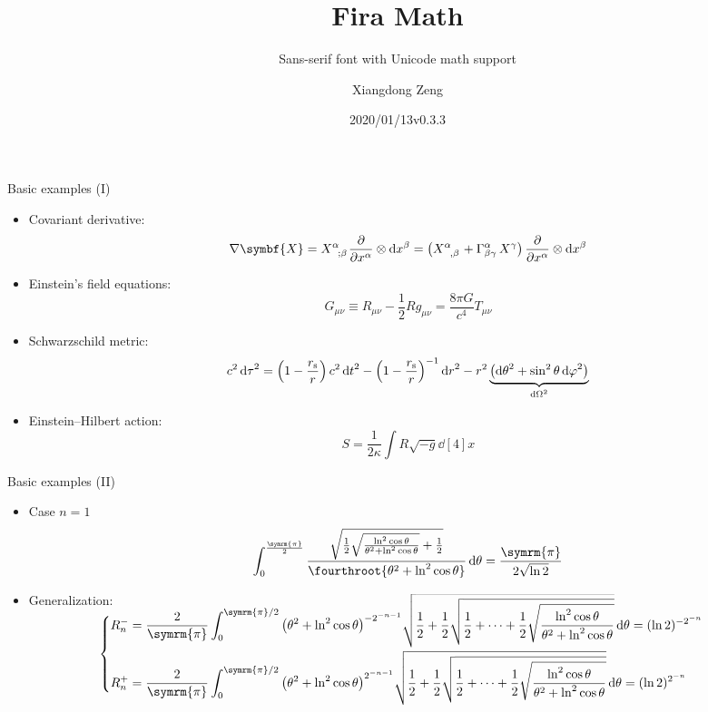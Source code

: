 \documentclass[aspectratio=169]{beamer}
\title{Fira Math}
\subtitle{Sans-serif font with Unicode math support}
\author{Xiangdong Zeng}
\date{2020/01/13\quad v0.3.3}
\def\pp{\symrm{\pi}}
\begin{document}
\maketitle

\begin{frame}{Basic examples (I)}
\begin{itemize}
  \item Covariant derivative:
    \[
      \nabla \symbf{X} = \tensor{X}{^\alpha_{;\beta}} \pdv{x^\alpha} \otimes \dd{x^\beta}
                       = \qty(\tensor{X}{^\alpha_{,\beta}} + \Gamma^{\alpha}_{\beta\gamma} \, X^\gamma) \,
                         \pdv{x^\alpha} \otimes \dd{x^\beta}
    \]
  \item Einstein's field equations:
    \[ G_{\mu\nu} \equiv R_{\mu\nu} - \frac{1}{2} R g_{\mu\nu} = \frac{8\pi G}{c^4} T_{\mu\nu} \]
  \item Schwarzschild metric:
    \[
      c^2 \dd{\tau}^2 = \qty(1-\frac{r_{\mathrm{s}}}{r}) \, c^2 \dd{t}^2
                      - \qty(1-\frac{r_{\mathrm{s}}}{r})^{-1} \dd{r}^2
                      - r^2 \underbrace{\qty(\dd{\theta}^2 + \sin^2 \theta \dd{\varphi}^2)}_{\dd{\Omega}^2}
    \]
  \item Einstein--Hilbert action:
    \[ S = \frac{1}{2\kappa} \int R \sqrt{-g} \dd[4]{x} \]
\end{itemize}
\end{frame}

\begin{frame}{Basic examples (II)}
\begin{itemize}
  \item Case $n=1$
    \small
    \[
      \int_0^{\frac{\pp}{2}}
        \frac{\sqrt{\frac12 \sqrt{\frac{\ln^2\cos\theta}{\theta^2+\ln^2\cos\theta}} + \frac12}}%
            {\fourthroot{\theta^2 + \ln^2\cos\theta}} \dd{\theta}
      = \frac{\pp}{2\sqrt{\ln 2}}
    \]
  \item Generalization:
    \small\vspace{1ex}
    \[
      \begin{cases}
        \smash[t]{\displaystyle
          R_n^- = \frac{2}{\pp} \int_0^{\pp/2} \qty(\theta^2+\ln^2\cos\theta)^{-2^{-n-1}}
                  \sqrt{\frac12+\frac12\sqrt{\frac12+\cdots+\frac12\sqrt{
                        \frac{\ln^2\cos\theta}{\theta^2+\ln^2\cos\theta}}}} \dd{\theta}
                = (\ln 2)^{-2^{-n}}} \\[3ex]
        \smash[b]{\displaystyle
          R_n^+ = \frac{2}{\pp} \int_0^{\pp/2} \qty(\theta^2+\ln^2\cos\theta)^{2^{-n-1}}
                  \sqrt{\frac12+\frac12\sqrt{\frac12+\cdots+\frac12\sqrt{
                        \frac{\ln^2\cos\theta}{\theta^2+\ln^2\cos\theta}}}} \dd{\theta}
                = (\ln 2)^{2^{-n}}}
      \end{cases}
    \]
\end{itemize}
\end{frame}
\end{document}
